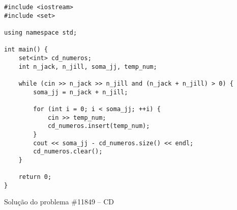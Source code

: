 \documentclass[a4paper,12pt]{scrartcl}
\begin{document}
\begin{listing}[H]
\begin{verbatim}
#include <iostream>
#include <set>

using namespace std;

int main() {
    set<int> cd_numeros;
    int n_jack, n_jill, soma_jj, temp_num;

    while (cin >> n_jack >> n_jill and (n_jack + n_jill) > 0) {
        soma_jj = n_jack + n_jill;

        for (int i = 0; i < soma_jj; ++i) {
            cin >> temp_num;
            cd_numeros.insert(temp_num);
        }
        cout << soma_jj - cd_numeros.size() << endl;
        cd_numeros.clear();
    }

    return 0;
}
\end{verbatim}
\caption{\footnotesize{Solução do problema \#11849 – CD}}
\end{listing}
\end{document}
